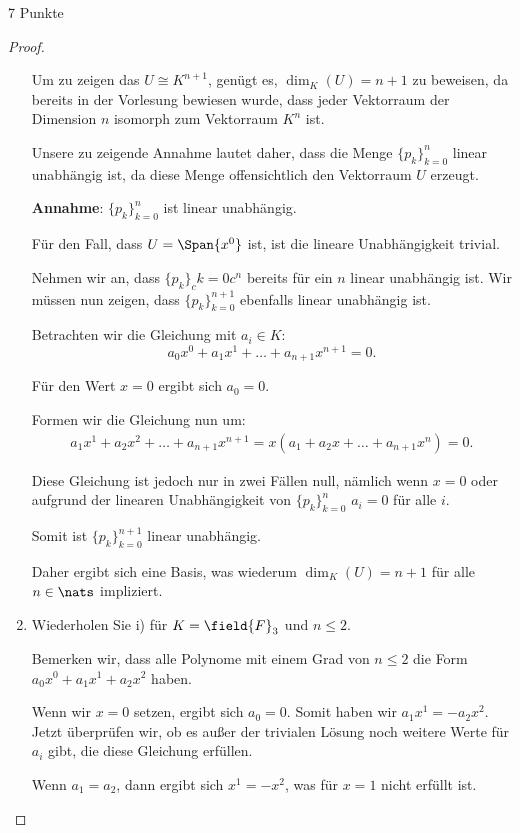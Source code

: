 \documentclass{problemset}
\begin{document}
\begin{problem}{7 Punkte}
\begin{proof}
\begin{enumerate}
		      Um zu zeigen das $U \cong K^{n+1}$, genügt es, $\dim_K(U) = n + 1$ zu beweisen, da bereits in der Vorlesung bewiesen wurde, dass
		      jeder Vektorraum der Dimension $n$ isomorph zum Vektorraum $K^n$ ist.

		      Unsere zu zeigende Annahme lautet daher, dass die Menge $\{p_k\}_{k=0}^{n}$ linear unabhängig ist, da diese Menge offensichtlich
		      den Vektorraum $U$ erzeugt.

		      \textbf{Annahme}: $\{p_k\}_{k=0}^{n}$ ist linear unabhängig.

		      Für den Fall, dass $U = \Span{x^0}$ ist, ist die lineare Unabhängigkeit trivial.

		      Nehmen wir an, dass $\{p_k\}_ck=0c^{n}$ bereits für ein $n$ linear unabhängig ist. Wir müssen nun zeigen, dass
		      $\{p_k\}_{k=0}^{n+1}$ ebenfalls linear unabhängig ist.

		      Betrachten wir die Gleichung mit $a_i \in K$:
		      \[
			      a_0 x^0 + a_1 x^1 + \ldots + a_{n+1} x^{n+1} = 0.
		      \]

		      Für den Wert $x = 0$ ergibt sich $a_0 = 0$.

		      Formen wir die Gleichung nun um:
		      \begin{align}
			      a_1 x^1 + a_2 x^2 + \ldots + a_{n+1}x^{n+1} = x(a_1 + a_2 x + \ldots + a_{n+1}x^n) = 0.
		      \end{align}

		      Diese Gleichung ist jedoch nur in zwei Fällen null, nämlich wenn $x = 0$ oder aufgrund der linearen Unabhängigkeit von
		      $\{p_k\}_{k=0}^{n}$ $a_i = 0$ für alle $i$.

		      Somit ist $\{p_k\}_{k=0}^{n+1}$ linear unabhängig.

		      Daher ergibt sich eine Basis, was wiederum $\dim_K(U) = n + 1$ für alle $n \in \nats$ impliziert. \checkmark

		\item Wiederholen Sie i) für $K = \field{F}_3$ und $n \leq 2$.

		      Bemerken wir, dass alle Polynome mit einem Grad von $n \leq 2$ die Form $a_0x^0 + a_1x^1 + a_2x^2$ haben.

		      Wenn wir $x = 0$ setzen, ergibt sich $a_0 = 0$. Somit haben wir $a_1x^1 = - a_2x^2$. Jetzt überprüfen wir, ob es außer der
		      trivialen Lösung noch weitere Werte für $a_i$ gibt, die diese Gleichung erfüllen.

		      Wenn $a_1 = a_2$, dann ergibt sich $x^1 = - x^2$, was für $x = 1$ nicht erfüllt ist.


\end{enumerate}
\end{proof}
\end{problem}
\end{document}
